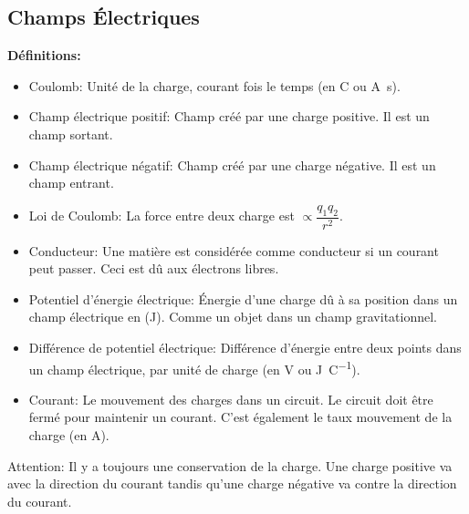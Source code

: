 \documentclass[french, a4paper, 12pt]{article}
\begin{document}
\subsection{Champs Électriques}
\textbf{Définitions:}
\begin{itemize}
\item Coulomb: Unité de la charge, courant fois le temps (en \si{\coulomb} ou \si{\ampere\second}).
\item Champ électrique positif: Champ créé par une charge positive. Il est un champ sortant.
\item Champ électrique négatif: Champ créé par une charge négative. Il est un champ entrant.
\item Loi de Coulomb: La force entre deux charge est $\propto \dfrac{q_1q_2}{r^2}$.
\item Conducteur: Une matière est considérée comme conducteur si un courant peut passer. Ceci est dû aux électrons libres.
\item Potentiel d'énergie électrique: Énergie d'une charge dû à sa position dans un champ électrique en (\si{\joule}). Comme un objet dans un champ gravitationnel.
\item Différence de potentiel électrique: Différence d'énergie entre deux points dans un champ électrique, par unité de charge (en \si{\volt} ou \si{\joule\per\coulomb}).
\item Courant: Le mouvement des charges dans un circuit. Le circuit doit être fermé pour maintenir un courant. C'est également le taux mouvement de la charge (en \si{\ampere}).
\end{itemize}
Attention: Il y a toujours une conservation de la charge. Une charge positive va avec la direction du courant tandis qu'une charge négative va contre la direction du courant.
\end{document}

